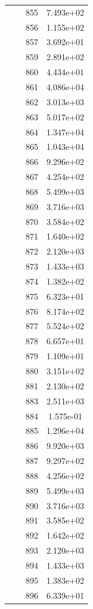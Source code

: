 \documentclass[12pt]{article}
\begin{document}
\begin{longtable}{@{}cccc@{}}
 &  & 855 & 7.493e+02 \\
 &  & 856 & 1.155e+02 \\
 &  & 857 & 3.692e+01 \\
 &  & 859 & 2.891e+02 \\
 &  & 860 & 4.434e+01 \\
 &  & 861 & 4.086e+04 \\
 &  & 862 & 3.013e+03 \\
 &  & 863 & 5.017e+02 \\
 &  & 864 & 1.347e+04 \\
 &  & 865 & 1.043e+04 \\
 &  & 866 & 9.296e+02 \\
 &  & 867 & 4.254e+02 \\
 &  & 868 & 5.499e+03 \\
 &  & 869 & 3.716e+03 \\
 &  & 870 & 3.584e+02 \\
 &  & 871 & 1.640e+02 \\
 &  & 872 & 2.120e+03 \\
 &  & 873 & 1.433e+03 \\
 &  & 874 & 1.382e+02 \\
 &  & 875 & 6.323e+01 \\
 &  & 876 & 8.174e+02 \\
 &  & 877 & 5.524e+02 \\
 &  & 878 & 6.657e+01 \\
 &  & 879 & 1.109e+01 \\
 &  & 880 & 3.151e+02 \\
 &  & 881 & 2.130e+02 \\
 &  & 883 & 2.511e+03 \\
 &  & 884 & 1.575e-01 \\
 &  & 885 & 1.296e+04 \\
 &  & 886 & 9.920e+03 \\
 &  & 887 & 9.297e+02 \\
 &  & 888 & 4.256e+02 \\
 &  & 889 & 5.499e+03 \\
 &  & 890 & 3.716e+03 \\
 &  & 891 & 3.585e+02 \\
 &  & 892 & 1.642e+02 \\
 &  & 893 & 2.120e+03 \\
 &  & 894 & 1.433e+03 \\
 &  & 895 & 1.383e+02 \\
 &  & 896 & 6.339e+01 \\

\end{longtable}
\end{document}

